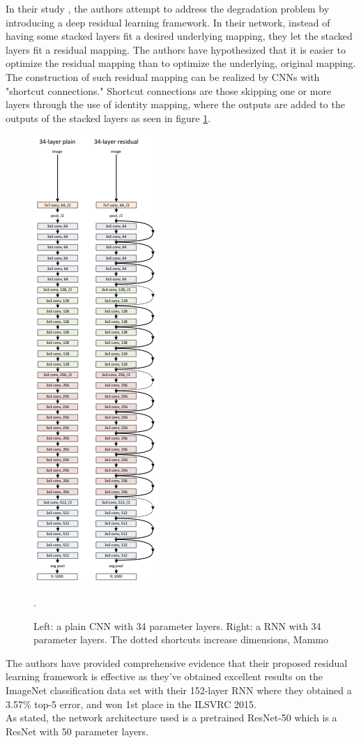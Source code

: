 	In their study \cite{Resnet}, the authors attempt to address the degradation problem by introducing a deep residual learning framework. In their network, instead of having some stacked layers fit a desired underlying mapping, they let the stacked layers fit a residual mapping. The authors have hypothesized that it is easier to optimize the residual mapping than to optimize the underlying, original mapping. The construction of such residual mapping can be realized by CNNs with "shortcut connections." Shortcut connections are those skipping one or more layers through the use of identity mapping, where the outputs are added to the outputs of the stacked layers as seen in figure \ref{fig:resNetSample}. \\

\begin{figure}[h]
	\centering
  	\includegraphics[scale=0.8]{images/resnet.png}
	 \caption{Left: a plain CNN with 34 parameter layers. Right: a RNN with 34 parameter layers. The dotted shortcuts increase dimensions, Mammo}.
  	\label{fig:resNetSample}
\end{figure}

	The authors have provided comprehensive evidence that their proposed residual learning framework is effective as they've obtained excellent results on the ImageNet classification data set with their 152-layer RNN where they obtained a 3.57\% top-5 error, and won 1st place in the ILSVRC 2015. \\

	As stated, the network architecture used is a pretrained ResNet-50 which is a ResNet with 50 parameter layers.
\clearpage